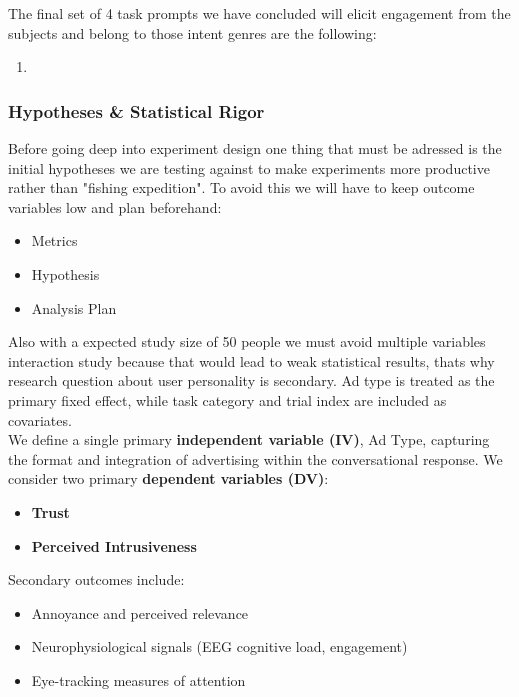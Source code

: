 \documentclass{article}
\begin{document}
The final set of 4 task prompts we have concluded will elicit engagement from the subjects and belong to those intent genres are the following:

\begin{enumerate}
    \item 
\end{enumerate}


\subsubsection{Hypotheses \& Statistical Rigor}

Before going deep into experiment design one thing that must be adressed is the initial hypotheses we are testing against to make experiments more productive rather than "fishing expedition". To avoid this we will have to keep outcome variables low and plan beforehand:

\begin{itemize}
    \item Metrics
    \item Hypothesis
    \item Analysis Plan
\end{itemize}

Also with a expected study size of 50 people we must avoid multiple variables interaction study because that would lead to weak statistical results, thats why research question about user personality is secondary. Ad type is treated as the primary fixed effect, while task category and trial index are included as covariates.
\\
We define a single primary \textbf{independent variable (IV)}, Ad Type, capturing the format and integration of advertising within the conversational response. We consider two primary \textbf{dependent variables (DV)}:
\begin{itemize}
    \item \textbf{Trust}
    \item \textbf{Perceived Intrusiveness}
\end{itemize}

Secondary outcomes include:
\begin{itemize}
    \item Annoyance and perceived relevance
    \item Neurophysiological signals (EEG cognitive load, engagement)
    \item Eye-tracking measures of attention
\end{itemize}
\end{document}
